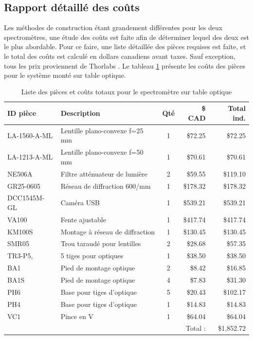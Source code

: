 \documentclass[11pt,letterpaper]{article}
\begin{document}


\subsection{Rapport détaillé des coûts}

Les méthodes de construction étant grandement différentes pour les deux spectromètres, une 
étude des coûts est faite afin de déterminer lequel des deux est le plus abordable. Pour ce
faire, une liste détaillée des pièces requises est faite, et le total des coûts est calculé en
dollars canadiens avant taxes. Sauf exception, tous les prix proviennent de Thorlabs \cite{noauthor_thorlabs_2024}. Le tableau \ref{prix_table} présente les coûts des pièces pour
le système monté sur table optique.

\begin{table}[!ht]
    \centering
    \caption{Liste des pièces et coûts totaux pour le spectromètre sur table optique \cite{noauthor_thorlabs_2024}}
    \begin{tabular}{|l|l|c|r|r|}
    \hline
        ID pièce & Description & Qté & \$ CAD & Total ind. \\ \hline\hline
        LA-1560-A-ML & Lentille plano-convexe f=25 mm & 1 & \$72.25 & \$72.25 \\ \hline
        LA-1213-A-ML & Lentille plano-convexe f=50 mm & 1 & \$70.61 & \$70.61 \\ \hline
        NE506A & Filtre atténuateur de lumière & 2 & \$59.55 & \$119.10 \\ \hline
        GR25-0605 & Réseau de diffraction 600/mm & 1 & \$178.32 & \$178.32 \\ \hline
        DCC1545M-GL & Caméra USB & 1 & \$539.21 & \$539.21 \\ \hline
        VA100 & Fente ajustable & 1 & \$417.74 & \$417.74 \\ \hline
        KM100S & Montage à réseau de diffraction & 1 & \$130.45 & \$130.45 \\ \hline
        SMR05 & Trou taraudé pour lentilles & 2 & \$28.68 & \$57.35 \\ \hline
        TR3-P5, & 5 tiges pour optiques & 1 & \$38.50 & \$38.50 \\ \hline
        BA1 & Pied de montage optique & 2 & \$8.42 & \$16.85 \\ \hline
        BA1S & Pied de montage optique & 4 & \$7.83 & \$31.30 \\ \hline
        PH6 & Base pour tiges d'optique & 5 & \$20.43 & \$102.17 \\ \hline
        PH4 & Base pour tiges d'optique & 1 & \$14.83 & \$14.83 \\ \hline
        VC1 & Pince en V & 1 & \$64.04 & \$64.04 \\ \hline\hline
        ~ & ~ & ~ & Total : & \$1,852.72 \\ \hline
    \end{tabular}
    \label{prix_table}
\end{table}
\end{document}
